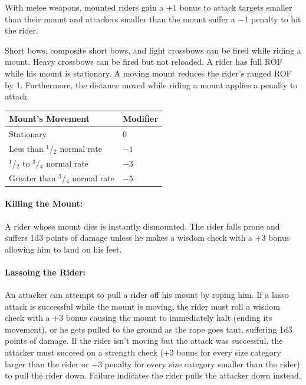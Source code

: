 \begin{multicols}{2}
With melee weapons, mounted riders gain a +1 bonus to attack targets smaller than their mount and attackers smaller than the mount suffer a $-1$ penalty to hit the rider.  

Short bows, composite short bows, and light crossbows can be fired while riding a mount.  Heavy crossbows can be fired but not reloaded.  A rider has full ROF while his mount is stationary.  A moving mount reduces the rider's ranged ROF by 1.  Furthermore, the distance moved while riding a mount applies a penalty to attack.

\noindent
\begin{minipage}{\columnwidth}

\label{mountedmissile}
\noindent
\begin{tabular}{|p{}|p{}|}
\hline
Mount's Movement	& Modifier \\
\hline\hline
\rowcolor[gray]{.9}Stationary	& 0 \\
Less than $^1$/$_2$ normal rate	& $-1$ \\
\rowcolor[gray]{.9}$^1$/$_2$ to $^3$/$_4$ normal rate	& $-3$ \\
Greater than $^3$/$_4$ normal rate	& $-5$ \\
\hline
\end{tabular}

\end{minipage}

\paragraph{Killing the Mount:} A rider whose mount dies is instantly dismounted.  The rider falls prone and suffers 1d3 points of damage unless he makes a wisdom check with a +3 bonus allowing him to land on his feet.  

\paragraph{Lassoing the Rider:} An attacker can attempt to pull a rider off his mount by roping him.  If a lasso attack is successful while the mount is moving, the rider must roll a wisdom check with a +3 bonus causing the mount to immediately halt (ending its movement), or he gets pulled to the ground as the rope goes taut, suffering 1d3 points of damage.  If the rider isn't moving but the attack was successful, the attacker must succeed on a strength check (+3 bonus for every size category larger than the rider or $-3$ penalty for every size category smaller than the rider) to pull the rider down.  Failure indicates the rider pulls the attacker down instead.


\end{multicols}
